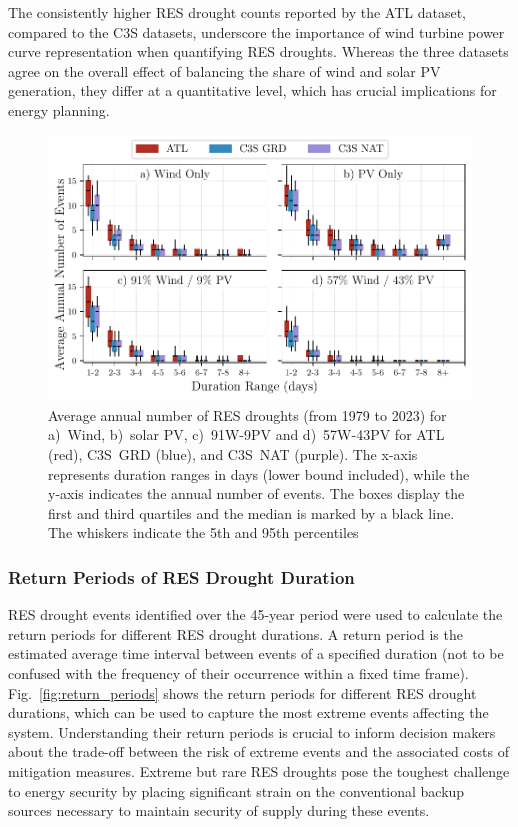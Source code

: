 \documentclass[preprint, 12pt]{elsarticle}
\begin{document}
The consistently higher RES drought counts reported by the ATL dataset, compared to the C3S datasets, underscore the importance of wind turbine power curve representation when quantifying RES droughts. Whereas the three datasets agree on the overall effect of balancing the share of wind and solar PV generation, they differ at a quantitative level, which has crucial implications for energy planning.

\begin{figure}[!ht]
	\centering
	\includegraphics[width=\textwidth]{droughts_number_events.pdf}
	\caption{Average annual number of RES droughts (from 1979 to 2023) for a)~Wind, b)~solar PV, c)~91W-9PV and d)~57W-43PV for ATL (red), C3S~GRD (blue), and C3S~NAT (purple). The x-axis represents duration ranges in days (lower bound included), while the y-axis indicates the annual number of events. The boxes display the first and third quartiles and the median is marked by a black line. The whiskers indicate the 5th and 95th percentiles}
	\label{fig:boxplot_number_events}	
\end{figure}

\subsubsection{Return Periods of RES Drought Duration}

RES drought events identified over the 45-year period were used to calculate the return periods for different RES drought durations. A return period is the estimated average time interval between events of a specified duration (not to be confused with the frequency of their occurrence within a fixed time frame). Fig.~\ref{fig:return_periods} shows the return periods for different RES drought durations, which can be used to capture the most extreme events affecting the system. Understanding their return periods is crucial to inform decision makers about the trade-off between the risk of extreme events and the associated costs of mitigation measures. Extreme but rare RES droughts pose the toughest challenge to energy security by placing significant strain on the conventional backup sources necessary to maintain security of supply during these events.
\end{document}

